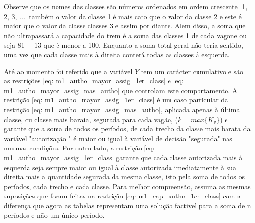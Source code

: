 Observe que os nomes das classes são números ordenados em ordem crescente [1, 2, 3, ...] também o valor da classe 1 é mais caro que o valor da classe 2 e este é maior que o valor da classe classes 3 e assim por diante. Alem disso, a soma que não ultrapassará a capacidade do trem é a soma das classes 1 de cada vagone ou seja 81 + 13 que é menor a 100. Enquanto a soma total geral não teria sentido, uma vez que cada classe mais à direita conterá todas as classes à esquerda.


Até ao momento foi referido que a variável $Y$ tem um carácter cumulativo e são as restrições \ref{eq: m1_autho_mayor_assig_1er_class} e \ref{eq: m1_autho_mayor_assig_mas_autho} que controlam este comportamento. A restrição \ref{eq: m1_autho_mayor_assig_1er_class} é um caso particular da restrição \ref{eq: m1_autho_mayor_assig_mas_autho}, aplicada apenas à última classe, ou classe mais barata, segurada para cada vagão, ($k=max\{K_v\}$) e garante que a soma de todos os períodos, de cada trecho da classe mais barata da variável "autorização " é maior ou igual à variável de decisão "segurada" nas mesmas condições. Por outro lado, a restrição \ref{eq: m1_autho_mayor_assig_1er_class} garante que cada classe autorizada mais à esquerda seja sempre maior ou igual à classe autorizada imediatamente à sua direita mais a quantidade segurada da mesma classe, isto pela soma de todos os períodos, cada trecho e cada classe. Para melhor compreensão, assuma as mesmas suposições que foram feitas na restrição \ref{eq: m1_cap_autho_1er_class} com a diferença que agora as tabelas representam uma solução factivel para a soma de n períodos e não um único período.


